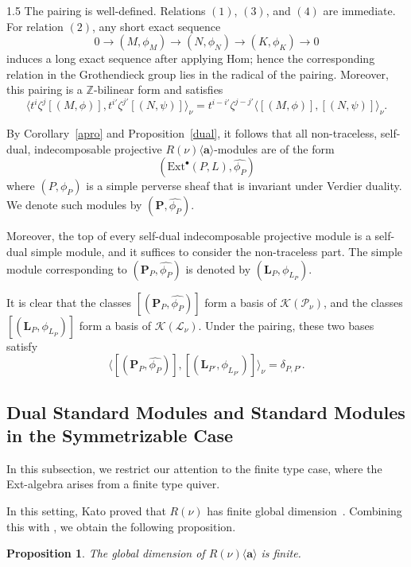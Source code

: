 \documentclass[10pt]{amsart}
\newtheorem{proposition}[theorem]{Proposition}
\begin{document}
\begin{spacing}{1.5}
The pairing is well-defined. Relations $(1)$, $(3)$, and $(4)$ are immediate. For relation $(2)$, any short exact sequence
\[
0 \to (M,\phi_M) \to (N,\phi_N) \to (K,\phi_K) \to 0
\]
induces a long exact sequence after applying $\mathrm{Hom}$; hence the corresponding relation in the Grothendieck group lies in the radical of the pairing. Moreover, this pairing is a $\mathbb{Z}$-bilinear form and satisfies
\[
\langle t^i \zeta^j [(M,\phi)], t^{i'} \zeta^{j'} [(N,\psi)] \rangle_{\nu} = t^{i - i'} \zeta^{j - j'} \langle [(M,\phi)], [(N,\psi)] \rangle_{\nu}.
\]

By Corollary~\ref{apro} and Proposition~\ref{dual}, it follows that all non-traceless, self-dual, indecomposable projective $R(\nu)\langle\mathbf{a}\rangle$-modules are of the form
\[
(\mathrm{Ext}^{\bullet}(P, L), \hat{\phi_P})
\]
where $(P,\phi_P)$ is a simple perverse sheaf that is invariant under Verdier duality. We denote such modules by $(\mathbf{P}, \hat{\phi_P})$.

Moreover, the top of every self-dual indecomposable projective module is a self-dual simple module, and it suffices to consider the non-traceless part. The simple module corresponding to $(\mathbf{P}_P,\hat{\phi_P})$ is denoted by $(\mathbf{L}_P,\phi_{L_P})$.

It is clear that the classes $[(\mathbf{P}_P,\hat{\phi_P})]$ form a basis of $\mathcal{K}(\mathcal{P}_{\nu})$, and the classes $[(\mathbf{L}_P,\phi_{L_P})]$ form a basis of $\mathcal{K}(\mathcal{L}_{\nu})$. Under the pairing, these two bases satisfy
\[
\langle [(\mathbf{P}_P,\hat{\phi_P})], [(\mathbf{L}_{P'},\phi_{L_{P'}})] \rangle_{\nu} = \delta_{P,P'}.
\]

\subsection{Dual Standard Modules and Standard Modules in the Symmetrizable Case}\label{dual standard}
In this subsection, we restrict our attention to the finite type case, where the Ext-algebra arises from a finite type quiver.

In this setting, Kato proved that $R(\nu)$ has finite global dimension~\cite{cd088214-009e-3813-9a86-97f9a299a24c}. Combining this with \cite[Lemma 3.1]{REITEN1985224}, we obtain the following proposition.
\begin{proposition}
The global dimension of $R(\nu)\langle\mathbf{a}\rangle$ is finite.
\end{proposition}


\end{spacing}
\end{document}
